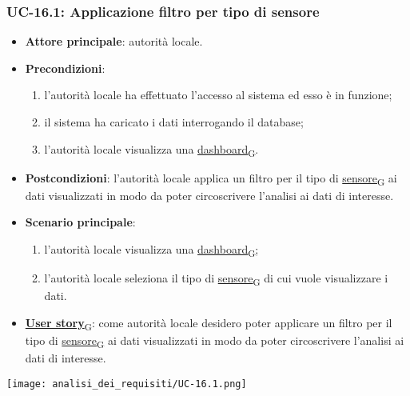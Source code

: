 \subsubsection{UC-16.1: Applicazione filtro per tipo di sensore}
\begin{itemize}
	\item \textbf{Attore principale}: autorità locale.
	\item \textbf{Precondizioni}:
	      \begin{enumerate}
		      \item l'autorità locale ha effettuato l'accesso al sistema ed esso è in funzione;
		      \item il sistema ha caricato i dati interrogando il database;
		      \item l'autorità locale visualizza una \href{https://7last.github.io/docs/pb/documentazione-interna/glossario\#dashboard}{dashboard\textsubscript{G}}.
	      \end{enumerate}
	\item \textbf{Postcondizioni}: l'autorità locale applica un filtro per il tipo di \href{https://7last.github.io/docs/pb/documentazione-interna/glossario\#sensore}{sensore\textsubscript{G}} ai dati visualizzati in modo da poter circoscrivere l'analisi ai dati di interesse.
	\item \textbf{Scenario principale}:
	      \begin{enumerate}
		      \item l'autorità locale visualizza una \href{https://7last.github.io/docs/pb/documentazione-interna/glossario\#dashboard}{dashboard\textsubscript{G}};
		      \item l'autorità locale seleziona il tipo di \href{https://7last.github.io/docs/pb/documentazione-interna/glossario\#sensore}{sensore\textsubscript{G}} di cui vuole visualizzare i dati.
	      \end{enumerate}
	\item \href{https://7last.github.io/docs/pb/documentazione-interna/glossario\#user-story}{\textbf{User story}\textsubscript{G}}:
	      come autorità locale desidero poter applicare un filtro per il tipo di \href{https://7last.github.io/docs/pb/documentazione-interna/glossario\#sensore}{sensore\textsubscript{G}} ai dati visualizzati in modo da poter circoscrivere l'analisi ai dati di interesse.
\end{itemize}
\begin{center}
	\texttt{[image: analisi\_dei\_requisiti/UC-16.1.png]}
\end{center}

